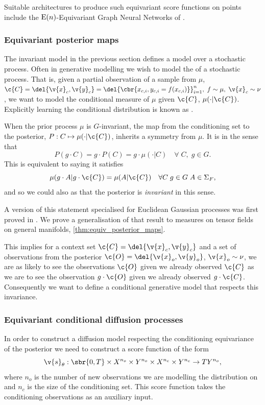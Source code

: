 Suitable architectures to produce such equivariant score functions on points include the \(\groupE[n]{}\)-Equivariant Graph Neural Networks of \textcite{satorras2021en}.

\subsubsection{Equivariant posterior maps}
\label{sec:equivariant_posterior}
The invariant model in the previous section defines a model over a stochastic process.
Often in generative modelling we wish to model the  of a stochastic process.
That is, given a partial observation of a sample from \(\mu\), \(\c{C} = \del{\v{x}_c, \v{y}_c} = \del{\cbr{x_{c,i}, y_{c,i} = f(x_{c, i})}}_{i=1}^n, \; f\sim \mu, \; \v{x}_c \sim \nu\), we want to model the conditional measure of \(\mu\) given \(\c{C}\), \(\mu(\cdot | \c{C})\).
Explicitly learning the conditional distribution is known as .

When the prior process \(\mu\) is \(G\)-invariant, the map from the conditioning set to the posterior, \(P: C\mapsto\mu(\cdot | \c{C})\), inherits a symmetry from \(\mu\).
It is  in the sense that \[
P(g \cdot C) = g \cdot P(C) = g \cdot \mu(\cdot | C) \quad\forall\;C, \; g\in G.
\]  
This is equivalent to saying it satisfies \[\mu(g\cdot A | g \cdot \c{C}) = \mu( A | \c{C}) \quad \forall C\; g\in G\; A\in \sigalg{F},\]
and so we could also as that the posterior is \emph{invariant} in this sense.

A version of this statement specialised for Euclidean Gaussian processes was first proved in \textcite{holderrieth2021equivariant}.
We prove a generalisation of that result to measures on tensor fields on general manifolds, \cref{thm:equiv_posterior_maps}.

This implies for a context set \(\c{C} = \del{\v{x}_c, \v{y}_c}\) and a set of observations from the posterior \(\c{O} = \del{\v{x}_o, \v{y}_o}\), \(\v{x}_o \sim \nu\), we are as likely to see the observations \(\c{O}\) given we already observed \(\c{C}\) as we are to see the observation \(g\cdot\c{O}\) given we already observed \(g\cdot\c{C}\).
Consequently we want to define a conditional generative model that respects this invariance.

\subsubsection{Equivariant conditional diffusion processes}
\label{sec:equiv_cond_diff_process}
In order to construct a diffusion model respecting the conditioning equivariance of the posterior we need to construct a score function of the form
\[
	\v{s}_\theta: \sbr{0, T} \x X^{n_o} \x Y^{n_o} \x X^{n_c} \x Y^{n_c} \to TY^{n_o},
\]
where \(n_o\) is the number of new observations we are modelling the distribution on and \(n_c\) is the size of the conditioning set.
This score function takes the conditioning observations as an auxiliary input.


